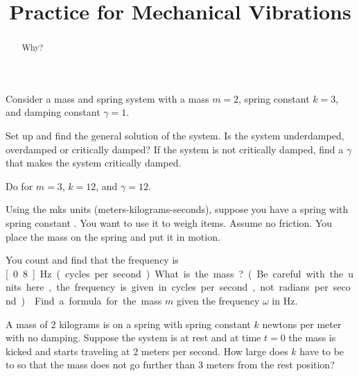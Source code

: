 \documentclass{ximera}
\title{Practice for Mechanical Vibrations}
\begin{document}
\begin{abstract}
    Why?
\end{abstract}
\maketitle


\begin{exercise} \label{mv:ex1}
    Consider a mass and spring system with a mass $m=2$, spring constant $k=3$, and damping constant $\gamma=1$.
    \begin{tasks}
        \task Set up and find the general solution of the system.
        \task Is the system underdamped, overdamped or critically damped?
        \task If the system is not critically damped, find a $\gamma$ that makes the system critically damped.
    \end{tasks}
\end{exercise}


\begin{exercise}
    Do  for $m=3$, $k=12$, and $\gamma=12$.
\end{exercise}

\begin{exercise} \label{mv:exwt1}
    Using the mks units (meters-kilograms-seconds), suppose you have a spring with spring constant . You want to use it to weigh items.  Assume no friction.  You place the mass on the spring and put it in motion. 
    \begin{tasks}
        \task You count and find that the frequency is \unit[0.8]{Hz} (cycles per second).  What is the mass? (Be careful with the units here, the frequency is given in cycles per second, not radians per second.)
        \task Find a formula for the mass $m$ given the frequency $\omega$ in \unit{Hz}.
    \end{tasks}
\end{exercise}

\begin{exercise}%
    A mass of $2$ kilograms is on a spring with spring constant $k$ newtons per meter with no damping.  Suppose the system is at rest and at time $t=0$ the mass is kicked and starts traveling at 2 meters per second.  How large does $k$ have to be to so that the mass does not go further than 3 meters from the rest position?
\end{exercise}
\end{document}
